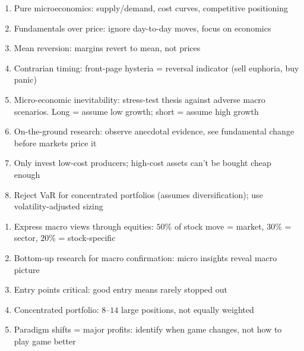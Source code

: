\documentclass[a4paper,oneside,openany]{book}
\begin{document}
\begin{remark} 
\begin{enumerate}[label=\roman*.]
\setlength{\itemsep}{0pt}
\item Pure microeconomics: supply/demand, cost curves, competitive positioning
\item Fundamentals over price: ignore day-to-day moves, focus on economics
\item Mean reversion: margins revert to mean, not prices
\item Contrarian timing: front-page hysteria = reversal indicator (sell euphoria, buy panic)
\item Micro-economic inevitability: stress-test thesis against adverse macro scenarios. Long = assume low growth; short = assume high growth
\item On-the-ground research: observe anecdotal evidence, see fundamental change before markets price it
\item Only invest low-cost producers; high-cost assets can't be bought cheap enough
\item Reject VaR for concentrated portfolios (assumes diversification); use volatility-adjusted sizing
\end{enumerate}
\end{remark}

\begin{remark} 
\begin{enumerate}[label=\roman*.]
\setlength{\itemsep}{0pt}
\item Express macro views through equities: $50\%$ of stock move = market, $30\%$ = sector, $20\%$ = stock-specific
\item Bottom-up research for macro confirmation: micro insights reveal macro picture
\item Entry points critical: good entry means rarely stopped out
\item Concentrated portfolio: $8$--$14$ large positions, not equally weighted
\item Paradigm shifts = major profits: identify when game changes, not how to play game better
\end{enumerate}
\end{remark}
\end{document}

